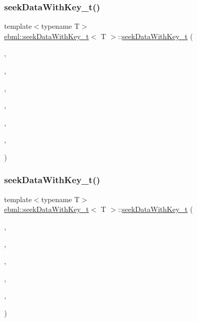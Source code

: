 \subsubsection{\texorpdfstring{seek\+Data\+With\+Key\+\_\+t()}{seekDataWithKey\_t()}\hspace{0.1cm}{\footnotesize\ttfamily [4/6]}}
{\footnotesize\ttfamily template$<$typename T$>$ \\
\mbox{\hyperlink{classebml_1_1seekDataWithKey__t}{ebml\+::seek\+Data\+With\+Key\+\_\+t}}$<$ T $>$\+::\mbox{\hyperlink{classebml_1_1seekDataWithKey__t}{seek\+Data\+With\+Key\+\_\+t}} (\begin{DoxyParamCaption}\item[{\mbox{\hyperlink{namespaceebml_a86c5f604ddf12a74aa9812e997a58691}{ebml\+I\+D\+\_\+t}}}]{,  }\item[{off\+\_\+t}]{,  }\item[{\mbox{\hyperlink{namespaceebml_a2ccdfb60b23efb51fe07f9d066e23604}{vint\+Width\+\_\+t}}}]{,  }\item[{size\+\_\+t}]{,  }\item[{const T \&}]{,  }\item[{const \mbox{\hyperlink{namespaceebml_adad533b7705a16bb360fe56380c5e7be}{ebml\+Element\+\_\+sp}} \&}]{,  }\item[{const \mbox{\hyperlink{namespaceebml_adad533b7705a16bb360fe56380c5e7be}{ebml\+Element\+\_\+sp}} \&}]{ }\end{DoxyParamCaption})}

\mbox{\label{classebml_1_1seekDataWithKey__t_a48a97c3a5b493a689a837e6f1d859469}} 
\subsubsection{\texorpdfstring{seek\+Data\+With\+Key\+\_\+t()}{seekDataWithKey\_t()}\hspace{0.1cm}{\footnotesize\ttfamily [5/6]}}
{\footnotesize\ttfamily template$<$typename T$>$ \\
\mbox{\hyperlink{classebml_1_1seekDataWithKey__t}{ebml\+::seek\+Data\+With\+Key\+\_\+t}}$<$ T $>$\+::\mbox{\hyperlink{classebml_1_1seekDataWithKey__t}{seek\+Data\+With\+Key\+\_\+t}} (\begin{DoxyParamCaption}\item[{\mbox{\hyperlink{namespaceebml_a86c5f604ddf12a74aa9812e997a58691}{ebml\+I\+D\+\_\+t}}}]{,  }\item[{off\+\_\+t}]{,  }\item[{\mbox{\hyperlink{namespaceebml_a2ccdfb60b23efb51fe07f9d066e23604}{vint\+Width\+\_\+t}}}]{,  }\item[{size\+\_\+t}]{,  }\item[{T \&\&}]{,  }\item[{const \mbox{\hyperlink{namespaceebml_adad533b7705a16bb360fe56380c5e7be}{ebml\+Element\+\_\+sp}} \&}]{ }\end{DoxyParamCaption})}

